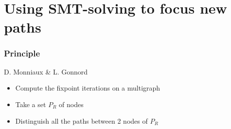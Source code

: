 \documentclass{beamer}
\begin{document}
\section[Path focusing]{Using SMT-solving to focus new paths}

\begin{frame}
  \frametitle{Principle}

D. Monniaux \& L. Gonnord
\bigskip
\begin{itemize}
\item Compute the fixpoint iterations on a multigraph
\item Take a set $P_R$ of nodes
\item Distinguish all the paths between 2 nodes of $P_R$
\end{itemize}
\bigskip
{}
\end{frame}
\end{document}

